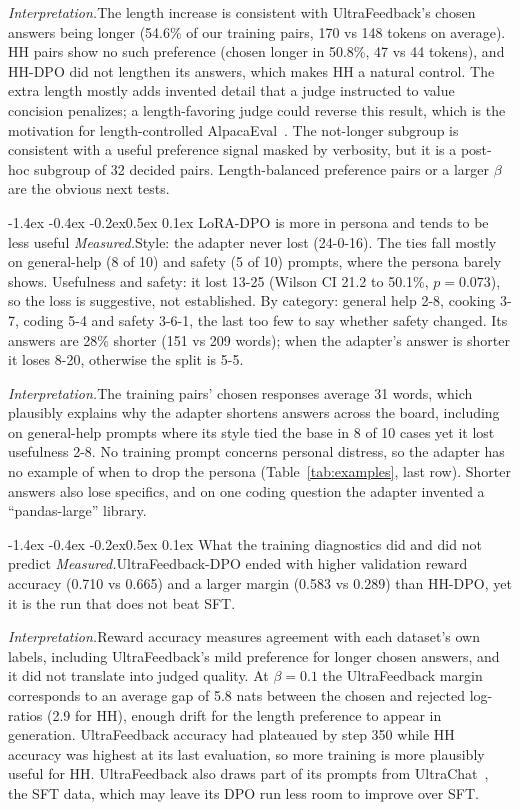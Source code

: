 \documentclass[10pt,letterpaper]{article}
\makeatletter
\renewcommand\subsection{\@startsection{subsection}{2}{\z@}%
  {-1.4ex \@plus -0.4ex \@minus -0.2ex}{0.5ex \@plus 0.1ex}%
  {\normalfont\normalsize\bfseries}}
\newcommand{\obs}{\textit{Measured.}\hspace{0.4em}}
\newcommand{\interp}{\textit{Interpretation.}\hspace{0.4em}}
\makeatother
\begin{document}
\interp The length increase is consistent with UltraFeedback's chosen answers being longer (54.6\% of our training pairs, 170 vs 148 tokens on average). HH pairs show no such preference (chosen longer in 50.8\%, 47 vs 44 tokens), and HH-DPO did not lengthen its answers, which makes HH a natural control. The extra length mostly adds invented detail that a judge instructed to value concision penalizes; a length-favoring judge could reverse this result, which is the motivation for length-controlled AlpacaEval~\cite{dubois2024}. The not-longer subgroup is consistent with a useful preference signal masked by verbosity, but it is a post-hoc subgroup of 32 decided pairs. Length-balanced preference pairs or a larger $\beta$ are the obvious next tests.

\subsection{LoRA-DPO is more in persona and tends to be less useful}
\obs Style: the adapter never lost (24-0-16). The ties fall mostly on general-help (8 of 10) and safety (5 of 10) prompts, where the persona barely shows. Usefulness and safety: it lost 13-25 (Wilson CI 21.2 to 50.1\%, $p=0.073$), so the loss is suggestive, not established. By category: general help 2-8, cooking 3-7, coding 5-4 and safety 3-6-1, the last too few to say whether safety changed. Its answers are 28\% shorter (151 vs 209 words); when the adapter's answer is shorter it loses 8-20, otherwise the split is 5-5.

\interp The training pairs' chosen responses average 31 words, which plausibly explains why the adapter shortens answers across the board, including on general-help prompts where its style tied the base in 8 of 10 cases yet it lost usefulness 2-8. No training prompt concerns personal distress, so the adapter has no example of when to drop the persona (Table~\ref{tab:examples}, last row). Shorter answers also lose specifics, and on one coding question the adapter invented a ``pandas-large'' library.

\subsection{What the training diagnostics did and did not predict}
\obs UltraFeedback-DPO ended with higher validation reward accuracy (0.710 vs 0.665) and a larger margin (0.583 vs 0.289) than HH-DPO, yet it is the run that does not beat SFT.

\interp Reward accuracy measures agreement with each dataset's own labels, including UltraFeedback's mild preference for longer chosen answers, and it did not translate into judged quality. At $\beta=0.1$ the UltraFeedback margin corresponds to an average gap of 5.8 nats between the chosen and rejected log-ratios (2.9 for HH), enough drift for the length preference to appear in generation. UltraFeedback accuracy had plateaued by step 350 while HH accuracy was highest at its last evaluation, so more training is more plausibly useful for HH. UltraFeedback also draws part of its prompts from UltraChat~\cite{cui2023}, the SFT data, which may leave its DPO run less room to improve over SFT.
\end{document}
